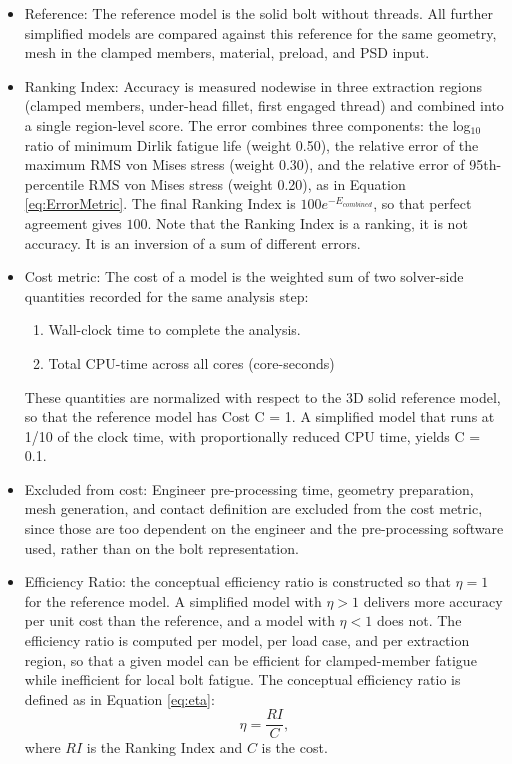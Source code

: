 \documentclass[a4paper,twoside]{bth}
\begin{document}
\begin{itemize}
    \item Reference: The reference model is the solid bolt without threads. All further simplified models are compared against this reference for the same geometry, mesh in the clamped members, material, preload, and \ac{PSD} input.
    \item Ranking Index: Accuracy is measured nodewise in three extraction regions (clamped members, under-head fillet, first engaged thread) and combined into a single region-level score. The error combines three components: the log$_{10}$ ratio of minimum Dirlik fatigue life (weight 0.50), the relative error of the maximum \ac{RMS} von Mises stress (weight 0.30), and the relative error of 95th-percentile \ac{RMS} von Mises stress (weight 0.20), as in Equation \ref{eq:ErrorMetric}. The final Ranking Index is $ 100 e^ {-E_{combined}}$, so that perfect agreement gives $100$. Note that the Ranking Index is a ranking, it is not accuracy. It is an inversion of a sum of different errors.
    \item Cost metric: The cost of a model is the weighted sum of two solver-side quantities recorded for the same analysis step:
        \begin{enumerate}
            \item Wall-clock time to complete the analysis.
            \item Total CPU-time across all cores (core-seconds)
        \end{enumerate}
        These quantities are normalized with respect to the 3D solid reference model, so that the reference model has Cost C = 1. A simplified model that runs at 1/10 of the clock time, with proportionally reduced \ac{CPU} time, yields C = 0.1.
    \item Excluded from cost: Engineer pre-processing time, geometry preparation, mesh generation, and contact definition are excluded from the cost metric, since those are too dependent on the engineer and the pre-processing software used, rather than on the bolt representation.
    \item Efficiency Ratio: the conceptual efficiency ratio is constructed so that $\eta = 1$ for the reference model. A simplified model with $\eta > 1$ delivers more accuracy per unit cost than the reference, and a model with $\eta < 1$ does not. The efficiency ratio is computed per model, per load case, and per extraction region, so that a given model can be efficient for clamped-member fatigue while inefficient for local bolt fatigue. The conceptual efficiency ratio is defined as in Equation \ref{eq:eta}:
    \begin{equation} \label{eq:eta}
        \eta = \frac{RI}{C},
    \end{equation}
    where $RI$ is the Ranking Index and $C$ is the cost. 
\end{itemize}
\end{document}

